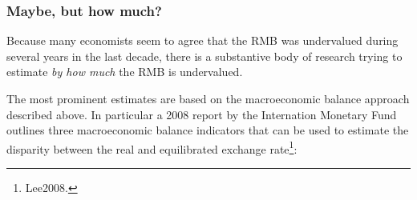 
\subsubsection{Maybe, but how much?}

Because many economists seem to agree that the RMB was undervalued during several years in the last decade, there is a substantive body of research trying to estimate \emph{by how much} the RMB is undervalued.

The most prominent estimates are based on the macroeconomic balance approach described above. In particular a 2008 report by the 
Internation Monetary Fund outlines three macroeconomic balance indicators that can be used to 
estimate the disparity between the real and equilibrated exchange 
rate\footnote{\cite{pp. 1}{Lee2008}.}:

